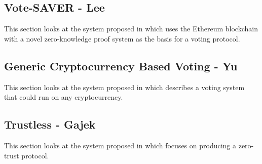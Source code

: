 
\subsection{Vote-SAVER - Lee}

This section looks at the system proposed in \cite{leeSAVERSNARKfriendlyAdditivelyhomomorphic2019} which uses the Ethereum blockchain with a novel zero-knowledge proof system as the basis for a voting protocol.


\subsection{Generic Cryptocurrency Based Voting - Yu}

This section looks at the system proposed in \cite{yuPlatformindependentSecureBlockchainBased2018} which describes a voting system that could run on any cryptocurrency.


\subsection{Trustless - Gajek}

This section looks at the system proposed in \cite{gajekTrustlessCensorshipResilientScalable2019} which focuses on producing a zero-trust protocol.


\newcommand*\YES{}
\newcommand*\NO{}

\newcommand*\NP{$n$}
\newcommand*\ALL{$Y$}
\newcommand*\SERVER{$Y_s$}
\newcommand*\REG{$Y_r$}
\newcommand*\SERVERREG{$Y_{rs}$}
\newcommand*\AUTH{$Y_a$}


